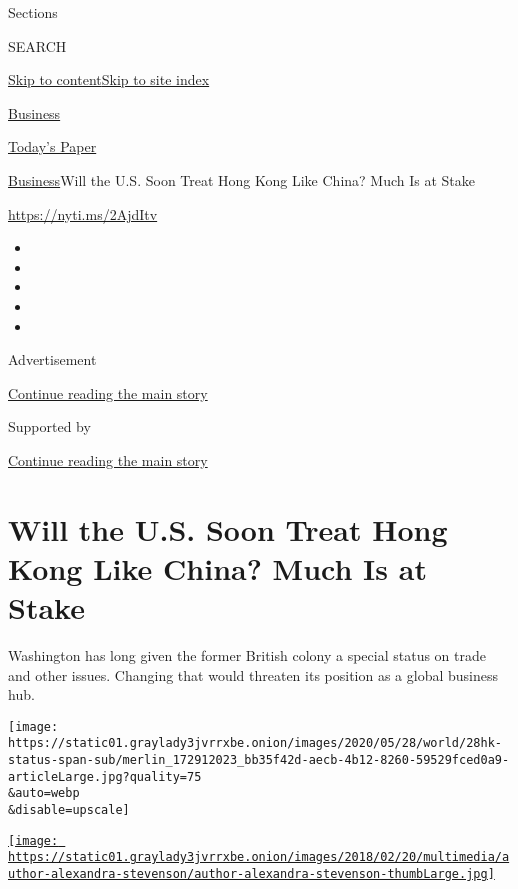 Sections

SEARCH

\protect\hyperlink{site-content}{Skip to
content}\protect\hyperlink{site-index}{Skip to site index}

\href{https://www.nytimes3xbfgragh.onion/section/business}{Business}

\href{https://myaccount.nytimes3xbfgragh.onion/auth/login?response_type=cookie\&client_id=vi}{}

\href{https://www.nytimes3xbfgragh.onion/section/todayspaper}{Today's
Paper}

\href{/section/business}{Business}\textbar{}Will the U.S. Soon Treat
Hong Kong Like China? Much Is at Stake

\url{https://nyti.ms/2AjdItv}

\begin{itemize}
\item
\item
\item
\item
\item
\end{itemize}

Advertisement

\protect\hyperlink{after-top}{Continue reading the main story}

Supported by

\protect\hyperlink{after-sponsor}{Continue reading the main story}

\hypertarget{will-the-us-soon-treat-hong-kong-like-china-much-is-at-stake}{%
\section{Will the U.S. Soon Treat Hong Kong Like China? Much Is at
Stake}\label{will-the-us-soon-treat-hong-kong-like-china-much-is-at-stake}}

Washington has long given the former British colony a special status on
trade and other issues. Changing that would threaten its position as a
global business hub.

\texttt{[image: https://static01.graylady3jvrrxbe.onion/images/2020/05/28/world/28hk-status-span-sub/merlin\_172912023\_bb35f42d-aecb-4b12-8260-59529fced0a9-articleLarge.jpg?quality=75\\\&auto=webp\\\&disable=upscale]}

\href{https://www.nytimes3xbfgragh.onion/by/alexandra-stevenson}{\texttt{[image: https://static01.graylady3jvrrxbe.onion/images/2018/02/20/multimedia/author-alexandra-stevenson/author-alexandra-stevenson-thumbLarge.jpg]}}

